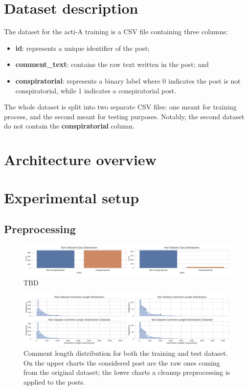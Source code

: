 \documentclass[11pt]{article}
\begin{document}
\section{Dataset description}\label{sec:dataset-description}
The dataset for the \ac{acti}-A training is a CSV file containing three columns:
\begin{itemize}
  \item \textbf{id}: represents a unique identifier of the post;
  \item \textbf{comment\_text}: contains the raw text written in the post; and
  \item \textbf{conspiratorial}: represents a binary label where 0 indicates the post is not conspiratorial,
    while 1 indicates a conspiratorial post.
\end{itemize}
The whole dataset is split into two separate CSV files: one meant for training process,
and the second meant for testing purposes.
%
Notably,
the second dataset do not contain the \textbf{conspiratorial} column.

\section{Architecture overview}\label{sec:architecture-overview}

\section{Experimental setup}\label{sec:experimental-setup}

\subsection{Preprocessing}\label{sec:preprocessing}
\begin{figure}
  \centering
  \includegraphics[width=\textwidth]{figures/class_distribution.pdf}
  \caption{TBD}
  \label{fig:class-frequency}
\end{figure}

\begin{figure}
  \centering
  \includegraphics[width=\textwidth]{figures/comment_length_distribution.pdf}
  \caption{
    Comment length distribution for both the training and test dataset.
    On the upper charts the considered post are the raw ones coming from the original dataset;
    the lower charts a cleanup preprocessing is applied to the posts.
  }
  \label{fig:words-distribution}
\end{figure}
\end{document}
